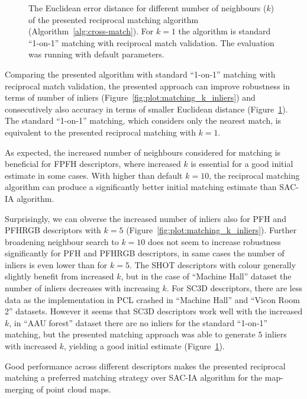 \begin{figure}
  \centering
  
  \caption[The Euclidean distance per $k$ in the reciprocal matching algorithm]{The Euclidean error distance for different number of neighbours ($k$) of the presented reciprocal matching algorithm (Algorithm~\ref{alg:cross-match}). For $k=1$ the algorithm is standard ``1-on-1'' matching with reciprocal match validation. The evaluation was running with default parameters.}
  \label{fig:plot:matching_k_dist}
\end{figure}

Comparing the presented algorithm with standard ``1-on-1'' matching with reciprocal match validation, the presented approach can improve robustness in terms of number of inliers (Figure~\ref{fig:plot:matching_k_inliers}) and consecutively also accuracy in terms of smaller Euclidean distance (Figure~\ref{fig:plot:matching_k_dist}). The standard ``1-on-1'' matching, which considers only the nearest match, is equivalent to the presented reciprocal matching with $k=1$.

As expected, the increased number of neighbours considered for matching is beneficial for \gls{FPFH} descriptors, where increased $k$ is essential for a good initial estimate in some cases. With higher than default $k=10$, the reciprocal matching algorithm can produce a significantly better initial matching estimate than \gls{SAC-IA} algorithm.

Surprisingly, we can obverse the increased number of inliers also for \gls{PFH} and \gls{PFHRGB} descriptors with $k=5$ (Figure~\ref{fig:plot:matching_k_inliers}). Further broadening neighbour search to $k=10$ does not seem to increase robustness significantly for \gls{PFH} and \gls{PFHRGB} descriptors, in same cases the number of inliers is even lower than for $k=5$. The \gls{SHOT} descriptors with colour generally slightly benefit from increased $k$, but in the case of ``Machine Hall'' dataset the number of inliers decreases with increasing $k$. For \gls{SC3D} descriptors, there are less data as the implementation in \gls{PCL} crashed in ``Machine Hall'' and ``Vicon Room 2'' datasets. However it seems that \gls{SC3D} descriptors work well with the increased $k$, in ``AAU forest'' dataset there are no inliers for the standard ``1-on-1'' matching, but the presented matching approach was able to generate $5$ inliers with increased $k$, yielding a good initial estimate (Figure~\ref{fig:plot:matching_k_dist}).

Good performance across different descriptors makes the presented reciprocal matching a preferred matching strategy over \gls{SAC-IA} algorithm for the map-merging of point cloud maps.

